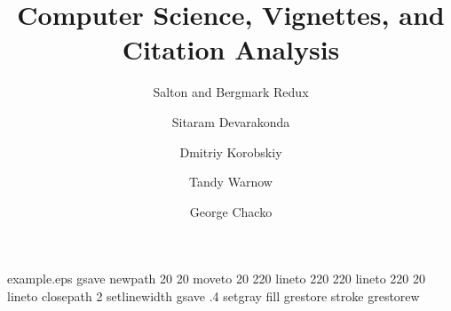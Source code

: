 %
%
%
%
%
\begin{filecontents*}{example.eps}
gsave
newpath
  20 20 moveto
  20 220 lineto
  220 220 lineto
  220 20 lineto
closepath
2 setlinewidth
gsave
  .4 setgray fill
grestore
stroke
grestorew
\end{filecontents*}
%
\RequirePackage{fix-cm}
%
\documentclass[smallextended]{svjour3}       %
%
\smartqed  %
%
\usepackage{graphicx}
\usepackage{xcolor}
\usepackage{listings}
%
%
%
%
%


\title{Computer Science, Vignettes, and Citation Analysis}
\subtitle{Salton and Bergmark Redux}

\author{Sitaram Devarakonda  \and
	Dmitriy Korobskiy \and
        Tandy Warnow \and
        George Chacko }


